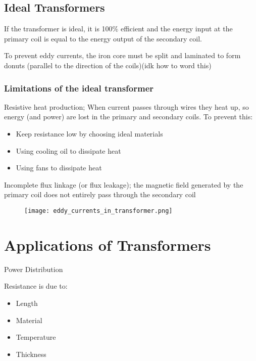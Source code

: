	\subsection{Ideal Transformers}
	
		If the transformer is ideal, it is 100\% efficient and the energy input at the primary coil is equal to the energy output of the secondary coil.
		
		To prevent eddy currents, the iron core must be split and laminated to form donuts (parallel to the direction of the coils)(idk how to word this)

		\subsubsection{Limitations of the ideal transformer}
		
			Resistive heat production; When current passes through wires they heat up, so energy (and power) are lost in the primary and secondary coils. To prevent this:

			\begin{itemize}
				\item Keep resistance low by choosing ideal materials
				\item Using cooling oil to dissipate heat
				\item Using fans to dissipate heat
			\end{itemize}

			Incomplete flux linkage (or flux leakage); the magnetic field generated by the primary coil does not entirely pass through the secondary coil

		\begin{figure}[H]
			\centering
			\texttt{[image: eddy\_currents\_in\_transformer.png]}
		\end{figure}

\section{Applications of Transformers} \label{20/03/2025}

	Power Distribution

	Resistance is due to:
	\begin{itemize}
		\item Length
		\item Material
		\item Temperature
		\item Thickness
	\end{itemize}

